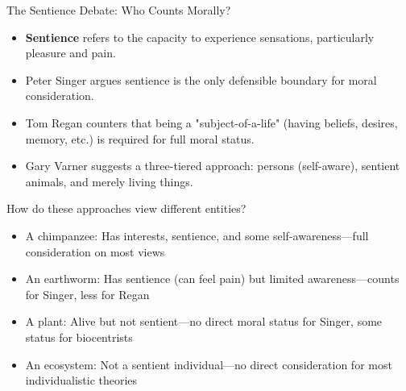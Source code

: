\documentclass{beamer}
\begin{document}
	\begin{frame}{The Sentience Debate: Who Counts Morally?}
		\begin{itemize}
			\item \textbf{Sentience} refers to the capacity to experience sensations, particularly pleasure and pain.
			\item Peter Singer argues sentience is the only defensible boundary for moral consideration.
			\item Tom Regan counters that being a "subject-of-a-life" (having beliefs, desires, memory, etc.) is required for full moral status.
			\item Gary Varner suggests a three-tiered approach: persons (self-aware), sentient animals, and merely living things.
		\end{itemize}
		
		\begin{example}
			\scriptsize
			How do these approaches view different entities?
			\begin{itemize}
				\item A chimpanzee: Has interests, sentience, and some self-awareness—full consideration on most views
				\item An earthworm: Has sentience (can feel pain) but limited awareness—counts for Singer, less for Regan
				\item A plant: Alive but not sentient—no direct moral status for Singer, some status for biocentrists
				\item An ecosystem: Not a sentient individual—no direct consideration for most individualistic theories
			\end{itemize}
		\end{example}
	\end{frame}
	
\end{document}
